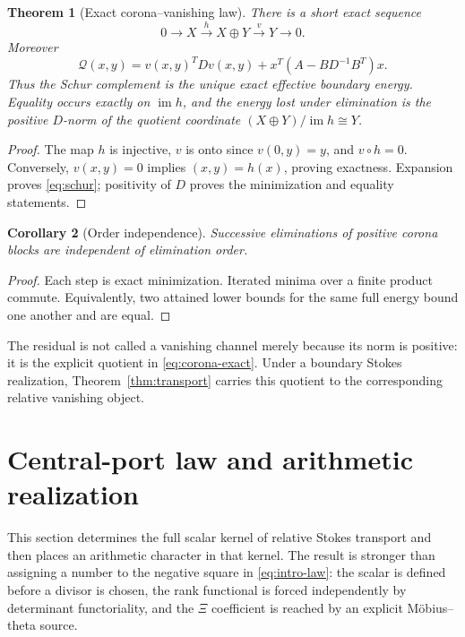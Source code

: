 \documentclass[11pt,a4paper]{amsart}
\theoremstyle{plain}
\newtheorem{theorem}{Theorem}[section]
\newtheorem{corollary}[theorem]{Corollary}
\theoremstyle{definition}
\newcommand{\im}{\operatorname{im}}
\begin{document}
\begin{theorem}[Exact corona--vanishing law]\label{thm:corona}
There is a short exact sequence
\begin{equation}\label{eq:corona-exact}
              0\longrightarrow X\xrightarrow{h}X\oplus Y
              \xrightarrow{v}Y\longrightarrow0.
\end{equation}
Moreover
\begin{equation}\label{eq:schur}
 \boxed{\mathcal Q(x,y)=v(x,y)^TDv(x,y)+x^T(A-BD^{-1}B^T)x.}
\end{equation}
Thus the Schur complement is the unique exact effective boundary energy.  Equality occurs exactly
on $\im h$, and the energy lost under elimination is the positive $D$-norm of the quotient
coordinate $(X\oplus Y)/\im h\cong Y$.
\end{theorem}

\begin{proof}
The map $h$ is injective, $v$ is onto since $v(0,y)=y$, and $v\circ h=0$.  Conversely,
$v(x,y)=0$ implies $(x,y)=h(x)$, proving exactness.  Expansion proves \eqref{eq:schur}; positivity
of $D$ proves the minimization and equality statements.
\end{proof}

\begin{corollary}[Order independence]\label{cor:order}
Successive eliminations of positive corona blocks are independent of elimination order.
\end{corollary}

\begin{proof}
Each step is exact minimization.  Iterated minima over a finite product commute.  Equivalently,
two attained lower bounds for the same full energy bound one another and are equal.
\end{proof}

The residual is not called a vanishing channel merely because its norm is positive: it is the
explicit quotient in \eqref{eq:corona-exact}.  Under a boundary Stokes realization,
Theorem~\ref{thm:transport} carries this quotient to the corresponding relative vanishing object.

\section{Central-port law and arithmetic realization}\label{sec:arithmetic}

This section determines the full scalar kernel of relative Stokes transport and then places an
arithmetic character in that kernel.  The result is stronger than assigning a number to the
negative square in \eqref{eq:intro-law}: the scalar is defined before a divisor is chosen, the
rank functional is forced independently by determinant functoriality, and the $\Xi$ coefficient is
reached by an explicit M\"obius--theta source.
\end{document}
